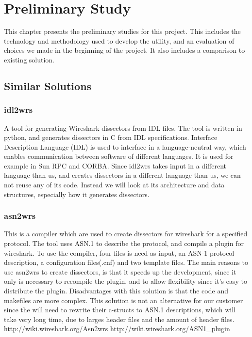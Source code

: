 \chapter{Preliminary Study}
This chapter presents the preliminary studies for this project. This includes
the technology and methodology used to develop the utility, and an evaluation
of choices we made in the beginning of the project. It also includes a
comparison to existing solution.

\section{Similar Solutions}

\subsection{idl2wrs}
A tool for generating Wireshark dissectors from IDL files. The tool is written
in python, and generates dissectors in C from IDL specifications. Interface
Description Language (IDL) is used to interface in a language-neutral way,
which enables communication between software of different languages. It is
used for example in Sun RPC and CORBA. Since idl2wrs takes input in a different
language than us, and creates dissectors in a different language than us, we
can not reuse any of its code. Instead we will look at its architecture and
data structures, especially how it generates dissectors.

\subsection{asn2wrs}
This is a compiler which are used to create dissectors for wireshark for a
specified protocol. The tool uses ASN.1 to describe the protocol, and compile a
plugin for wireshark. To use the compiler, four files is need as input, an
ASN-1 protocol description, a configuration files(.cnf) and two template files.
The main reasons to use asn2wrs to create dissectors, is that it speeds up the
development, since it only is necessary to recompile the plugin, and to allow
flexibility since it’s easy to distribute the plugin. Disadvantages with this
solution is that the code and makefiles are more complex. This solution is not
an alternative for our customer since the will need to rewrite their c-structs
to ASN.1 descriptions, which will take very long time, due to larges header
files and the amount of header files.
http://wiki.wireshark.org/Asn2wrs
http://wiki.wireshark.org/ASN1_plugin

